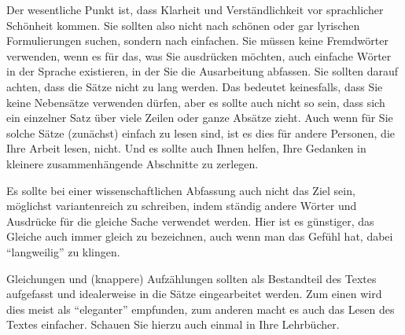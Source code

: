 Der wesentliche Punkt ist, dass Klarheit und Verständlichkeit vor sprachlicher Schönheit kommen.
Sie sollten also nicht nach schönen oder gar lyrischen Formulierungen suchen, sondern nach einfachen.
Sie müssen keine Fremdwörter verwenden, wenn es für das, was Sie ausdrücken möchten, auch einfache Wörter in der Sprache existieren, in der Sie die Ausarbeitung abfassen.
Sie sollten darauf achten, dass die Sätze nicht zu lang werden.
Das bedeutet keinesfalls, dass Sie keine Nebensätze verwenden dürfen, aber es sollte auch nicht so sein, dass sich ein einzelner Satz über viele Zeilen oder ganze Absätze zieht.
Auch wenn für Sie solche Sätze (zunächst) einfach zu lesen sind, ist es dies für andere Personen, die Ihre Arbeit lesen, nicht.
Und es sollte auch Ihnen helfen, Ihre Gedanken in kleinere zusammenhängende Abschnitte zu zerlegen.

Es sollte bei einer wissenschaftlichen Abfassung auch nicht das Ziel sein, möglichst variantenreich zu schreiben, indem ständig andere Wörter und Ausdrücke für die gleiche Sache verwendet werden.
Hier ist es günstiger, das Gleiche auch immer gleich zu bezeichnen, auch wenn man das Gefühl hat, dabei "`langweilig"' zu klingen.

Gleichungen und (knappere) Aufzählungen sollten als Bestandteil des Textes aufgefasst und idealerweise in die Sätze eingearbeitet werden.
Zum einen wird dies meist als "`eleganter"' empfunden, zum anderen macht es auch das Lesen des Textes einfacher.
Schauen Sie hierzu auch einmal in Ihre Lehrbücher.
